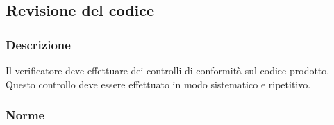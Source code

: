 \subsection{Revisione del codice}
\label{revisione-codice}

\subsubsection{Descrizione}

Il verificatore deve effettuare dei controlli di conformità sul codice
prodotto. Questo controllo deve essere effettuato in modo sistematico e
ripetitivo.

\subsubsection{Norme}
